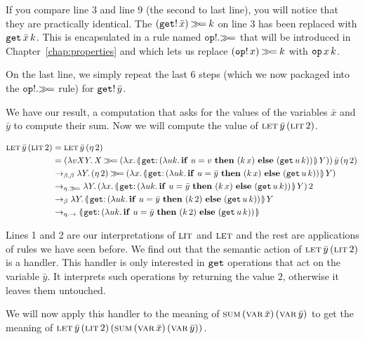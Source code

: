 If you compare line 3 and line 9 (the second to last line), you will
notice that they are practically identical. The $(\mathtt{get}!\,\bar{x})
\mathbin{\gg\!=} k$ on line 3 has been replaced with
$\mathtt{get}\,\bar{x}\,k$. This is encapsulated in a rule named
$\mathtt{op}!.\mathbin{\gg\!=}$ that will be introduced in Chapter~\ref{chap:properties}
and which lets us replace $(\mathtt{op}!\,x) \mathbin{\gg\!=} k$ with
$\mathtt{op}\,x\,k$.

On the last line, we simply repeat the last 6 steps (which we now packaged
into the $\mathtt{op}!.\mathbin{\gg\!=}$ rule) for $\mathtt{get}!\,\bar{y}$.

We have our result, a computation that asks for the values of the variables
$\bar{x}$ and $\bar{y}$ to compute their sum. Now we will compute the value
of $\textsc{let}\,\bar{y}\,(\textsc{lit}\,2)$.

\begin{align*}
  \app{\lete}{\bar{y}}{\litec{2}}
&= \app{\lete}{\bar{y}}{(\ap{\eta}{2})} \\
&= \appp{(\lam{v X Y}{X \hsbind (\lam{x}{\ap{\banana{\onto{\op{get}} {(\lam{u k}{\ifte{u = v}{(\ap{k}{x})} {(\app{\op{get}}{u}{k})}})}}}{Y}})})} {\bar{y}}{(\ap{\eta}{2})} \\
&\to_{\beta,\beta} \lam{Y}{(\ap{\eta}{2}) \hsbind (\lam{x}{\ap{\banana{\onto{\op{get}}{(\lam{u k}{\ifte{u = \bar{y}}{(\ap{k}{x})}{(\app{\op{get}}{u}{k})}})}}}{Y}})} \\
&\to_{\eta.\hsbind} \lam{Y}{\ap{(\lam{x}{\ap{\banana{\onto{\op{get}}{(\lam{u k}{\ifte{u = \bar{y}}{(\ap{k}{x})}{(\app{\op{get}}{u}{k})}})}}}{Y}})}{2}} \\
&\to_{\beta} \lam{Y}{\ap{\banana{\onto{\op{get}}{(\lam{u k}{\ifte{u = \bar{y}}{(\ap{k}{2})}{(\app{\op{get}}{u}{k})}})}}}{Y}} \\
&\to_{\eta.\to} \banana{\onto{\op{get}}{(\lam{u k}{\ifte{u = \bar{y}}{(\ap{k}{2})}{(\app{\op{get}}{u}{k})}})}}
\end{align*}

Lines 1 and 2 are our interpretations of $\textsc{lit}$ and $\textsc{let}$ and the rest
are applications of rules we have seen before. We find out that the
semantic action of $\textsc{let}\,\bar{y}\,(\textsc{lit}\,2)$ is a handler. This
handler is only interested in $\mathtt{get}$ operations that act on the
variable $\bar{y}$. It interprets such operations by returning the value
$2$, otherwise it leaves them untouched.

We will now apply this handler to the meaning of
$\textsc{sum}\,(\textsc{var}\,\bar{x})\,(\textsc{var}\,\bar{y})$ to get the meaning of
$\textsc{let}\,\bar{y}\,(\textsc{lit}\,2)\,(\textsc{sum}\,(\textsc{var}\,\bar{x})\,(\textsc{var}\,\bar{y}))$.

